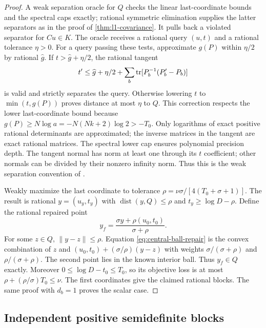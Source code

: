 \begin{proof}
A weak separation oracle for $Q$ checks the linear last-coordinate
bounds and the spectral caps exactly; rational symmetric elimination
supplies the latter separators as in the proof of
\cref{thm:l1-covariance}. It pulls back a violated separator for $Cu\in K$.
The oracle receives a rational query $(u,t)$ and a rational tolerance
$\eta>0$. For a query passing these tests, approximate $g(P)$ within
$\eta/2$ by
rational $\widehat g$. If $t>\widehat g+\eta/2$, the rational tangent
\begin{equation}\label{eq:logdet-tangent}
 t'\le\widehat g+\eta/2+
                  \sum_b\operatorname{tr}[P_b^{-1}(P_b'-P_b)]
\end{equation}
is valid and strictly separates the query. Otherwise lowering $t$ to
$\min(t,g(P))$ proves distance at most $\eta$ to $Q$. This correction
respects the lower last-coordinate bound because
$g(P)\ge N\log a=-N(Nk+2)\log2>-T_0$.
Only logarithms of exact positive rational determinants are approximated;
the inverse matrices in the tangent are exact rational matrices. The
spectral lower cap ensures polynomial precision depth. The tangent
normal has norm at least one through its $t$ coefficient; other normals
can be divided by their nonzero infinity norm. Thus this is the weak
separation convention of \citet[Theorem (3.1)]{gls1981}.

Weakly maximize the last coordinate to tolerance
$\rho=\nu\sigma/[4(T_0+\sigma+1)]$. The result is rational
$y=(u_y,t_y)$ with $\operatorname{dist}(y,Q)\le\rho$ and
$t_y\ge\log D-\rho$. Define the rational repaired point
\begin{equation}\label{eq:central-ball-repair}
 y_f=\frac{\sigma y+\rho(u_0,t_0)}{\sigma+\rho}.
\end{equation}
For some $z\in Q$, $\|y-z\|\le\rho$. Equation
\eqref{eq:central-ball-repair} is the convex combination of $z$ and
$(u_0,t_0)+(\sigma/\rho)(y-z)$ with weights
$\sigma/(\sigma+\rho)$ and $\rho/(\sigma+\rho)$. The second point
lies in the known interior ball. Thus $y_f\in Q$ exactly. Moreover
$0\le\log D-t_0\le T_0$, so its objective loss is at most
$\rho+(\rho/\sigma)T_0\le\nu$. The first coordinates give the claimed
rational blocks. The same proof with $d_b=1$ proves the scalar case.
\end{proof}

\subsection{Independent positive semidefinite blocks}


